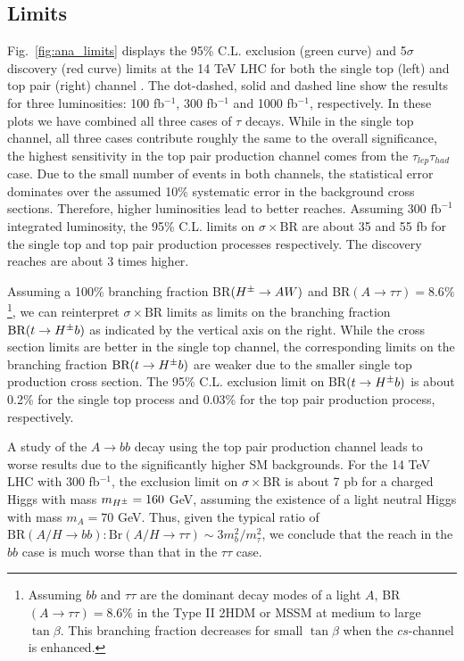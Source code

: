 \subsection{Limits}
\label{sec:ana_limits}

Fig.~\ref{fig:ana_limits} displays the  95\% C.L. exclusion (green curve) and 5$\sigma$ discovery (red curve) limits at the 14 TeV LHC for both the single top (left) and top pair (right) channel . The dot-dashed, solid and dashed line show the results for three luminosities: 100 fb$^{-1}$, 300 fb$^{-1}$  and 1000 fb$^{-1}$,  respectively. In these plots we have combined all three cases of $\tau$ decays. While in the single top channel,  all three cases contribute roughly the same to the overall significance,  the highest sensitivity in the top pair production channel  comes from the $\tau_{lep}\tau_{had}$ case. Due to the small number of events in both channels, the statistical error dominates over the assumed 10\% systematic error in the background cross sections.    Therefore, higher luminosities lead to  better reaches.    Assuming 300 $\text{fb}^{-1}$   integrated luminosity, the 95\% C.L. limits on $\sigma\times\text{BR}$ are about 35 and 55 fb for the single top and top pair production processes respectively.   The discovery reaches are about 3 times higher. 

Assuming a 100\% branching fraction BR$(H^{\pm} \to A W )$ and  BR$(A \to \tau\tau)=8.6\%$\footnote{Assuming $bb$ and $\tau\tau$ are the dominant decay modes of a light $A$, BR$(A \to \tau\tau)=8.6$\% in the Type II 2HDM or MSSM at medium to large $\tan\beta$. This branching fraction decreases for small $\tan\beta$ when the $cs$-channel is enhanced.},  we can reinterpret $\sigma\times\text{BR}$ limits as limits on the branching fraction $\text{BR}(t \to H^{\pm} b)$ as indicated by the vertical axis on the right.   While the cross section limits are better in the single top channel,   the corresponding limits on the branching fraction $\text{BR}(t \to H^{\pm} b)$ are weaker due to the smaller single top production cross section.   The 95\% C.L. exclusion limit on BR$(t \to H^{\pm} b)$ is about 0.2\% for the single top process and  0.03\% for the top pair production process, respectively.

A study of the $A \to bb$ decay using the top pair production channel leads to worse results due to the significantly higher SM backgrounds.  For the 14 TeV LHC with 300 fb$^{-1}$, the exclusion limit on $\sigma \times \text{BR}$ is about 7 pb for a charged Higgs with mass $m_{H^{\pm}} = 160$ GeV,  assuming the existence of a light neutral Higgs with mass $m_A=70$ GeV. Thus, given the typical ratio of $\text{BR}(A/H \to bb) : \text{Br}(A/H\to \tau\tau) \sim 3m^2_b/m^2_{\tau}$, we conclude that the reach in the $bb$ case is much worse than that in  the $\tau\tau$ case.

